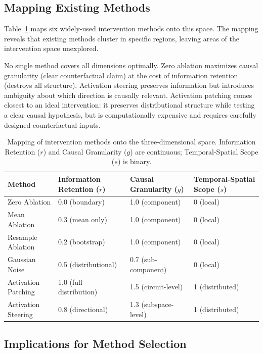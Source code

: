\documentclass[pdflatex,sn-mathphys-num]{sn-jnl}
\begin{document}
\subsection{Mapping Existing Methods}
\label{sec:mapping}

Table~\ref{tab:mapping} maps six widely-used intervention methods onto this space. The mapping reveals that existing methods cluster in specific regions, leaving areas of the intervention space unexplored.

No single method covers all dimensions optimally. Zero ablation maximizes causal granularity (clear counterfactual claim) at the cost of information retention (destroys all structure). Activation steering preserves information but introduces ambiguity about which direction is causally relevant. Activation patching comes closest to an ideal intervention: it preserves distributional structure while testing a clear causal hypothesis, but is computationally expensive and requires carefully designed counterfactual inputs.

\begin{table}
\centering
\caption{Mapping of intervention methods onto the three-dimensional space. Information Retention ($r$) and Causal Granularity ($g$) are continuous; Temporal-Spatial Scope ($s$) is binary.}
\label{tab:mapping}
\begin{tabular}{lp{2.5cm}p{2.5cm}p{2.5cm}}
\toprule
Method & Information Retention ($r$) & Causal Granularity ($g$) & Temporal-Spatial Scope ($s$) \\
\midrule
Zero Ablation & 0.0 (boundary) & 1.0 (component) & 0 (local) \\
Mean Ablation & 0.3 (mean only) & 1.0 (component) & 0 (local) \\
Resample Ablation & 0.2 (bootstrap) & 1.0 (component) & 0 (local) \\
Gaussian Noise & 0.5 (distributional) & 0.7 (sub-component) & 0 (local) \\
Activation Patching & 1.0 (full distribution) & 1.5 (circuit-level) & 1 (distributed) \\
Activation Steering & 0.8 (directional) & 1.3 (subspace-level) & 1 (distributed) \\
\bottomrule
\end{tabular}
\end{table}

\subsection{Implications for Method Selection}
\label{sec:selection}
\end{document}
